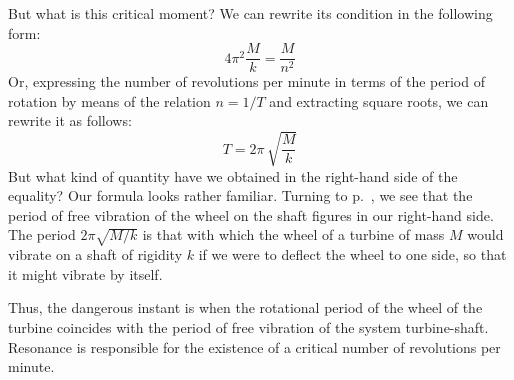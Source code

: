 But what is this critical moment? We can rewrite its condition in the following form:
 \begin{equation*}%
4 \pi^{2} \dfrac{M}{k}   =  \dfrac{M}{n^{2}}
 \end{equation*}
Or, expressing the number of revolutions per minute in terms of the period of rotation by means of the relation $n = 1/ T$ and extracting square roots, we can rewrite it as follows:
 \begin{equation*}%
T  = 2 \pi  \, \sqrt{\dfrac{M}{k}}
 \end{equation*}
But what kind of quantity have we obtained in the right-hand side of the equality? Our formula looks rather familiar. Turning to p.~\pageref{pend-osc}, we see that the period of free vibration of the wheel on the shaft figures in our right-hand side. The period $2 \pi \sqrt{ M/k}$ is that with which the wheel of a turbine of mass $M$ would vibrate on a shaft of rigidity $k$ if we were to deflect the wheel to one side, so that it might vibrate by itself.

Thus, the dangerous instant is when the rotational period of the wheel of the turbine coincides with the period of free vibration of the system turbine-shaft. Resonance is responsible for the existence of a critical number of revolutions per minute.
